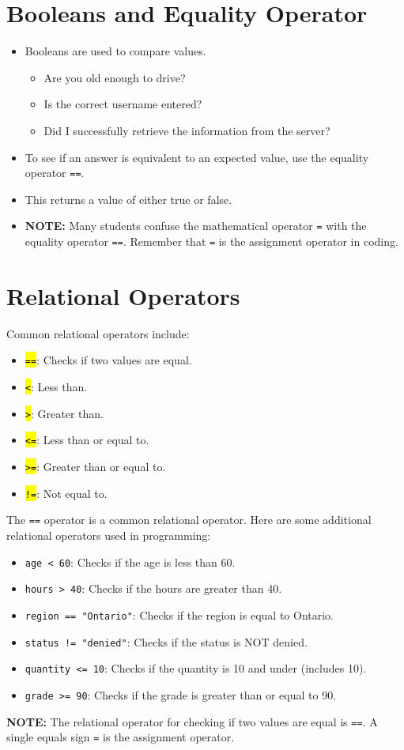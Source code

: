 \documentclass{article}
\begin{document}
\section{Booleans and Equality Operator}
\begin{itemize}
    \item Booleans are used to compare values.
    \begin{itemize}
        \item Are you old enough to drive?
        \item Is the correct username entered?
        \item Did I successfully retrieve the information from the server?
    \end{itemize}
    \item To see if an answer is equivalent to an expected value, use the equality operator \texttt{==}.
    \item This returns a value of either true or false.
    \item \textbf{NOTE:} Many students confuse the mathematical operator \texttt{=} with the equality operator \texttt{==}. Remember that \texttt{=} is the assignment operator in coding.
\end{itemize}

\section{Relational Operators}
Common relational operators include:
    \begin{itemize}
        \item \texttt{\hl{==}}: Checks if two values are equal.
        \item \texttt{\hl{<}}: Less than.
        \item \texttt{\hl{>}}: Greater than.
        \item \texttt{\hl{<=}}: Less than or equal to.
        \item \texttt{\hl{>=}}: Greater than or equal to.
        \item \texttt{\hl{!=}}: Not equal to.
    \end{itemize}
The \texttt{==} operator is a common relational operator. Here are some additional relational operators used in programming:

\begin{itemize}
        \item \texttt{age < 60}: Checks if the age is less than 60.
        \item \texttt{hours > 40}: Checks if the hours are greater than 40.
        \item \texttt{region == "Ontario"}: Checks if the region is equal to Ontario.
        \item \texttt{status != "denied"}: Checks if the status is NOT denied.
        \item \texttt{quantity <= 10}: Checks if the quantity is 10 and under (includes 10).
        \item \texttt{grade >= 90}: Checks if the grade is greater than or equal to 90.
    \end{itemize}
\textbf{NOTE:} The relational operator for checking if two values are equal is \texttt{==}. A single equals sign \texttt{=} is the assignment operator.
\end{document}

